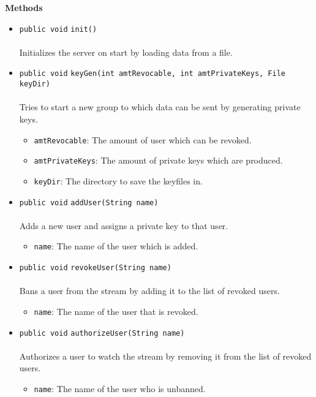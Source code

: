 \textbf{\sffamily Methods}
\begin{itemize}
\item \lstinline|public void| \lstinline|init|\lstinline|()|\\ \\[-0.6em]
Initializes the server on start by loading data from a file.



\item \lstinline|public void| \lstinline|keyGen|\lstinline|(int amtRevocable, int amtPrivateKeys, File keyDir)|\\ \\[-0.6em]
Tries to start a new group to which data can be sent by generating private keys.
\begin{itemize}
\item \lstinline|amtRevocable|: The amount of user which can be revoked.
\item \lstinline|amtPrivateKeys|: The amount of private keys which are produced.
\item \lstinline|keyDir|: The directory to save the keyfiles in.
\end{itemize}



\item \lstinline|public void| \lstinline|addUser|\lstinline|(String name)|\\ \\[-0.6em]
Adds a new user and assigns a private key to that user.
\begin{itemize}
\item \lstinline|name|: The name of the user which is added.
\end{itemize}



\item \lstinline|public void| \lstinline|revokeUser|\lstinline|(String name)|\\ \\[-0.6em]
Bans a user from the stream by adding it to the list of revoked users.
\begin{itemize}
\item \lstinline|name|: The name of the user that is revoked.
\end{itemize}



\item \lstinline|public void| \lstinline|authorizeUser|\lstinline|(String name)|\\ \\[-0.6em]
Authorizes a user to watch the stream by removing it from the list of revoked users.
\begin{itemize}
\item \lstinline|name|: The name of the user who is unbanned.
\end{itemize}




\end{itemize}

